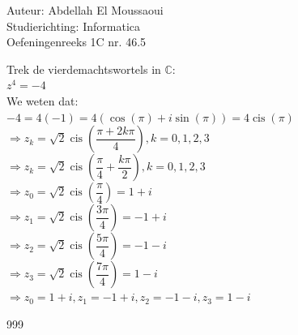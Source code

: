 \documentclass[a4paper]{article}
\begin{document}
  
\noindent \large Auteur: Abdellah El Moussaoui\\
\noindent \large Studierichting: Informatica\\
\noindent \large Oefeningenreeks 1C nr. 46.5\\

\medskip

\normalsize

\medskip

Trek de vierdemachtswortels in $\mathbb{C}$:\\

$z^4=-4$\\

We weten dat: \\

$-4=4(-1)=4(\cos(\pi)+i\sin(\pi))=4\operatorname{cis}(\pi)$\\

$\Rightarrow z_k=\sqrt{2}\operatorname{cis}\left(\dfrac{\pi+2k\pi}{4}\right),k=0,1,2,3$\\

$\Rightarrow z_k=\sqrt{2}\operatorname{cis}\left(\dfrac{\pi}{4}+\dfrac{k\pi}{2}\right),k=0,1,2,3$\\

$\Rightarrow z_0=\sqrt{2}\operatorname{cis}\left(\dfrac{\pi}{4}\right)=1+i$\\


$\Rightarrow z_1=\sqrt{2}\operatorname{cis}\left(\dfrac{3\pi}{4}\right)=-1+i$\\

$\Rightarrow z_2=\sqrt{2}\operatorname{cis}\left(\dfrac{5\pi}{4}\right)=-1-i$\\

$\Rightarrow z_3=\sqrt{2}\operatorname{cis}\left(\dfrac{7\pi}{4}\right)=1-i$\\

$\Rightarrow \boxed{z_0=1+i,z_1=-1+i,z_2=-1-i,z_3=1-i}$\\


\begin{thebibliography}{999}
\end{thebibliography}
\end{document}

